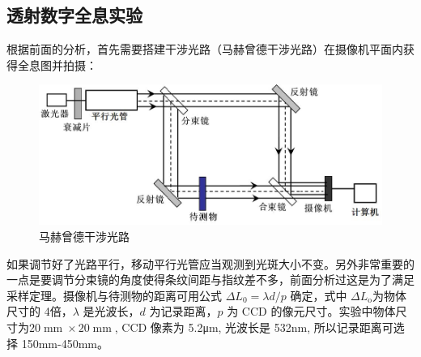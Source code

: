 \documentclass{WHUReport}
\begin{document}
\begin{multicols}{2}
	\section{透射数字全息实验}
	根据前面的分析，首先需要搭建干涉光路（马赫曾德干涉光路）在摄像机平面内获得全息图并拍摄：
	\begin{figure}[H]
		\centering
		\includegraphics[width=\linewidth]{figs/透射全息.jpg}
		\caption{马赫曾德干涉光路}
	\end{figure}
	如果调节好了光路平行，移动平行光管应当观测到光斑大小不变。另外非常重要的一点是要调节分束镜的角度使得条纹间距与指纹差不多，前面分析过这是为了满足采样定理。摄像机与待测物的距离可用公式 $\Delta L_0=\lambda d/p$ 确定，式中 $\Delta L_{\mathrm{o}}$为物体尺寸的 4倍，$\lambda$ 是光波长，$d$ 为记录距离，$p$ 为 CCD 的像元尺寸。实验中物体尺寸为$20\operatorname{mm}\times 20\operatorname{mm}$, CCD 像素为 5.2μm, 光波长是 532nm, 所以记录距离可选择 150mm\mbox{-}450mm。
	

\end{multicols}
\end{document}
